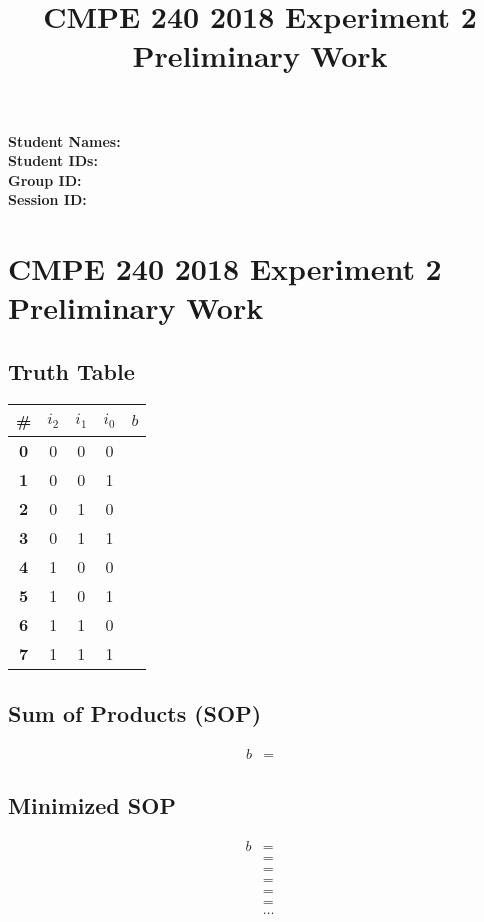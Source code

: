\documentclass[12pt,a4paper]{report}
\title{CMPE 240 2018 Experiment 2 Preliminary Work}
\begin{document}
\noindent
\textbf{Student Names: } \\
\textbf{Student IDs: } \\
\textbf{Group ID: } \\
\textbf{Session ID: }

\section*{CMPE 240 2018 Experiment 2 Preliminary Work}
\subsection*{Truth Table}

\begin{center}
\begin{tabular}{|c|ccc|c|}
\hline
\textbf{\#} & \textbf{$i_2$} & \textbf{$i_1$} &\textbf{$i_0$} & \textbf{$b$} \\
\hline
\textbf{0} & 0 & 0 & 0 &   \\
\hline
\textbf{1} & 0 & 0 & 1 &   \\
\hline
\textbf{2} & 0 & 1 & 0 &   \\
\hline
\textbf{3} & 0 & 1 & 1 &   \\
\hline
\textbf{4} & 1 & 0 & 0 &   \\
\hline
\textbf{5} & 1 & 0 & 1 &   \\
\hline
\textbf{6} & 1 & 1 & 0 &   \\
\hline
\textbf{7} & 1 & 1 & 1 &   \\
\hline
\end{tabular}
\end{center}

\subsection*{Sum of Products (SOP)}

\begin{align*}
	b & = 
\end{align*}

\subsection*{Minimized SOP}

\begin{align*}
	b & = \\
	    & = \\
	    & = \\
	    & = \\
	    & = \\
	    & = \\
	    & \ldots
\end{align*}
\end{document}
